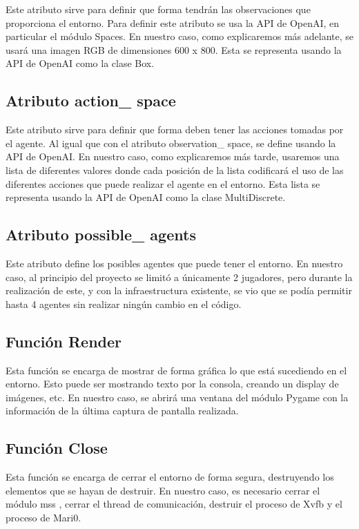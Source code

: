 Este atributo sirve para definir que forma tendrán las observaciones que proporciona el entorno. Para definir este atributo se usa la API de OpenAI, en particular el módulo Spaces. En nuestro caso, como explicaremos más adelante, se usará una imagen RGB de dimensiones 600 x 800. Esta se representa usando la API de OpenAI como la clase Box.

\subsection*{Atributo action\_ space}

Este atributo sirve para definir que forma deben tener las acciones tomadas por el agente. Al igual que con el atributo observation\_ space, se define usando la API de OpenAI. En nuestro caso, como explicaremos más tarde, usaremos una lista de diferentes valores donde cada posición de la lista codificará el uso de las diferentes acciones que puede realizar el agente en el entorno. Esta lista se representa usando la API de OpenAI como la clase MultiDiscrete.

\subsection*{Atributo possible\_ agents}

Este atributo define los posibles agentes que puede tener el entorno. En nuestro caso, al principio del proyecto se limitó a únicamente 2 jugadores, pero durante la realización de este, y con la infraestructura existente, se vio que se podía permitir hasta 4 agentes sin realizar ningún cambio en el código.

\subsection*{Función Render}

Esta función se encarga de mostrar de forma gráfica lo que está sucediendo en el entorno. Esto puede ser mostrando texto por la consola, creando un display de imágenes, etc. En nuestro caso, se abrirá una ventana del módulo Pygame \cite {pygame} con la información de la última captura de pantalla realizada.

\subsection*{Función Close}

Esta función se encarga de cerrar el entorno de forma segura, destruyendo los elementos que se hayan de destruir. En nuestro caso, es necesario cerrar el módulo mss \cite {mss}, cerrar el thread de comunicación, destruir el proceso de Xvfb \cite {xvfb} y el proceso de Mari0.

